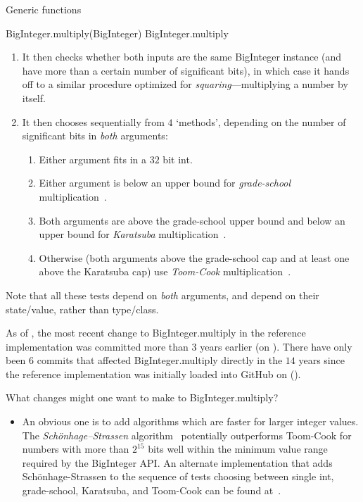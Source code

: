 \documentclass[12pt]{PalisadesLakesBook}
\begin{document}
\begin{plSection}{Generic functions}
\begin{plExample}{{\javaFont BigInteger.multiply(BigInteger)}
}{BigInteger.multiply}
\begin{enumerate}
\item It then checks whether both inputs are the same 
{\javaFont BigInteger} instance (and have more 
than a certain number of significant bits),
in which case it hands off to a similar  procedure optimized
for \textit{squaring}---multiplying  a number by itself.

\item It then chooses sequentially from $4$ `methods', 
depending on the number of
significant bits in \textit{both} arguments:
\begin{enumerate}
  \item Either argument fits in a $32$ bit {\javaFont int}.
  \item Either argument is below an upper bound for
  \textit{grade-school} 
  multiplication~\cite{wiki:GradeSchoolMultiplication}.
  \item Both arguments are above the grade-school upper bound 
  and below an upper bound for \textit{Karatsuba}
   multiplication~\cite{wiki:KaratsubaMultiplication}.
  \item Otherwise (both arguments above the grade-school cap
  and at least one above the Karatsuba cap)
  use \textit{Toom-Cook} 
  multiplication~\cite{wiki:ToomCookMultiplication}.
\end{enumerate}
\end{enumerate}

Note that all these tests depend on \textit{both} arguments,
and depend on their state/value, rather than type/class.
\end{plExample}%

As of ,
the most recent change to {\javaFont BigInteger.multiply} 
in the reference implementation was committed more than $3$ years 
earlier (on ).
There have only been $6$ commits 
that affected {\javaFont BigInteger.multiply} directly
in the $14$ years
since the reference implementation was initially loaded into 
GitHub on ().

What changes might one want to make to 
{\javaFont BigInteger.multiply}?

\begin{itemize}
\item An obvious one is to add algorithms which are faster for
larger integer values.
The \textit{Sch\"{o}nhage–Strassen} 
algorithm~\cite{wiki:SchonhageStrassenMultiplication}
potentially outperforms Toom-Cook for numbers with more
than $2^{15}$ bits well within the minimum value range
required by the {\javaFont BigInteger} API.
An alternate implementation that adds Sch\"{o}nhage-Strassen
to the sequence of tests choosing between
single {\javaFont int}, grade-school, Karatsuba, and
Toom-Cook can be found at~\cite{tbuktu:2015:EfficientBigIntegerImplementation}.


\end{itemize}
\end{plSection}
\end{document}
